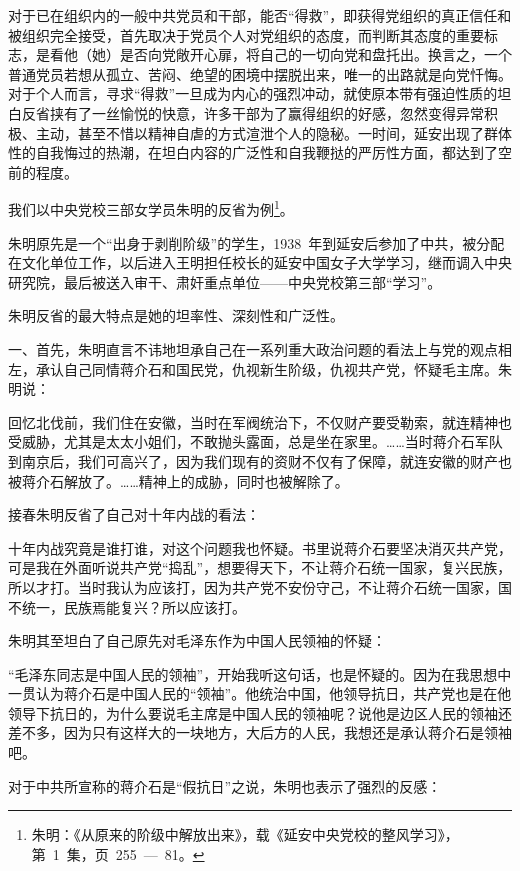 对于已在组织内的一般中共党员和干部，能否“得救”，即获得党组织的真正信任和被组织完全接受，首先取决于党员个人对党组织的态度，而判断其态度的重要标志，是看他（她）是否向党敞开心扉，将自己的一切向党和盘托出。换言之，一个普通党员若想从孤立、苦闷、绝望的困境中摆脱出来，唯一的出路就是向党忏悔。对于个人而言，寻求“得救”一旦成为内心的强烈冲动，就使原本带有强迫性质的坦白反省挟有了一丝愉悦的快意，许多干部为了赢得组织的好感，忽然变得异常积极、主动，甚至不惜以精神自虐的方式渲泄个人的隐秘。一时间，延安出现了群体性的自我悔过的热潮，在坦白内容的广泛性和自我鞭挞的严厉性方面，都达到了空前的程度。

我们以中央党校三部女学员朱明的反省为例\footnote{朱明：《从原来的阶级中解放出来》，载《延安中央党校的整风学习》，第~1~集，页~255~—~81。}。

朱明原先是一个“出身于剥削阶级”的学生，1938~年到延安后参加了中共，被分配在文化单位工作，以后进入王明担任校长的延安中国女子大学学习，继而调入中央研究院，最后被送入审干、肃奸重点单位——中央党校第三部“学习”。

朱明反省的最大特点是她的坦率性、深刻性和广泛性。

一、首先，朱明直言不讳地坦承自己在一系列重大政治问题的看法上与党的观点相左，承认自己同情蒋介石和国民党，仇视新生阶级，仇视共产党，怀疑毛主席。朱明说：

\begin{quoting}
回忆北伐前，我们住在安徽，当时在军阀统治下，不仅财产要受勒索，就连精神也受威胁，尤其是太太小姐们，不敢抛头露面，总是坐在家里。……当时蒋介石军队到南京后，我们可高兴了，因为我们现有的资财不仅有了保障，就连安徽的财产也被蒋介石解放了。……精神上的成胁，同时也被解除了。
\end{quoting}
接春朱明反省了自己对十年内战的看法：

\begin{quoting}
十年内战究竟是谁打谁，对这个问题我也怀疑。书里说蒋介石要坚决消灭共产党，可是我在外面听说共产党“捣乱”，想要得天下，不让蒋介石统一国家，复兴民族，所以才打。当时我认为应该打，因为共产党不安份守己，不让蒋介石统一国家，国不统一，民族焉能复兴？所以应该打。
\end{quoting}
朱明其至坦白了自己原先对毛泽东作为中国人民领袖的怀疑：

\begin{quoting}
“毛泽东同志是中国人民的领袖”，开始我听这句话，也是怀疑的。因为在我思想中一贯认为蒋介石是中国人民的“领袖”。他统治中国，他领导抗日，共产党也是在他领导下抗日的，为什么要说毛主席是中国人民的领袖呢？说他是边区人民的领袖还差不多，因为只有这样大的一块地方，大后方的人民，我想还是承认蒋介石是领袖吧。
\end{quoting}
对于中共所宣称的蒋介石是“假抗日”之说，朱明也表示了强烈的反感：

